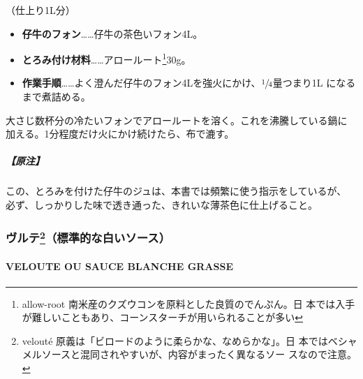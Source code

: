 
（仕上り1L分）

\begin{itemize}
\item
  \textbf{仔牛のフォン}\ldots{}\ldots{}仔牛の茶色いフォン4L。
\item
  \textbf{とろみ付け材料}\ldots{}\ldots{}アロールート\footnote{allow-root
    南米産のクズウコンを原料とした良質のでんぷん。日
    本では入手が難しいこともあり、コーンスターチが用いられることが多い}30g。
\item
  \textbf{作業手順}\ldots{}\ldots{}よく澄んだ仔牛のフォン4Lを強火にかけ、\(\sfrac{1}{4}\)量つまり1L
  になるまで煮詰める。
\end{itemize}

大さじ数杯分の冷たいフォンでアロールートを溶く。これを沸騰している鍋に
加える。1分程度だけ火にかけ続けたら、布で漉す。

\hypertarget{ux539fux6ce8-2}{%
\subparagraph{【原注】}\label{ux539fux6ce8-2}}

この、とろみを付けた仔牛のジュは、本書では頻繁に使う指示をしているが、
必ず、しっかりした味で透き通った、きれいな薄茶色に仕上げること。

\maeaki

\hypertarget{ux30f4ux30ebux30c6102013ux6a19ux6e96ux7684ux306aux767dux3044ux30bdux30fcux30b9}{%
\subsubsection[ヴルテ（標準的な白いソース）]{\texorpdfstring{ヴルテ\footnote{velouté
  原義は「ビロードのように柔らかな、なめらかな」。日
  本ではベシャメルソースと混同されやすいが、内容がまったく異なるソー
  スなので注意。}（標準的な白いソース）}{ヴルテ（標準的な白いソース）}}\label{ux30f4ux30ebux30c6102013ux6a19ux6e96ux7684ux306aux767dux3044ux30bdux30fcux30b9}}

\hypertarget{veloute}{%
\paragraph{VELOUTE OU SAUCE BLANCHE GRASSE}\label{veloute}}


